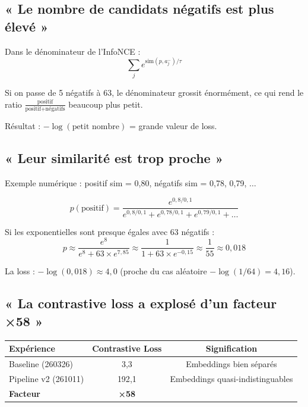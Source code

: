 \documentclass[11pt,a4paper]{article}
\begin{document}
\subsection{« Le nombre de candidats négatifs est plus élevé »}

Dans le dénominateur de l'InfoNCE :
\begin{equation}
\sum_j e^{\text{sim}(p, a^-_j)/\tau}
\end{equation}

Si on passe de 5 négatifs à 63, le dénominateur grossit énormément, ce qui rend le ratio $\frac{\text{positif}}{\text{positif} + \text{négatifs}}$ beaucoup plus petit.

Résultat : $-\log(\text{petit nombre})$ = grande valeur de loss.

\subsection{« Leur similarité est trop proche »}

Exemple numérique : positif sim = 0{,}80, négatifs sim = 0{,}78, 0{,}79, $\ldots$

\begin{equation}
p(\text{positif}) = \frac{e^{0{,}8/0{,}1}}{e^{0{,}8/0{,}1} + e^{0{,}78/0{,}1} + e^{0{,}79/0{,}1} + \ldots}
\end{equation}

Si les exponentielles sont presque égales avec 63 négatifs :
\begin{equation}
p \approx \frac{e^8}{e^8 + 63 \times e^{7{,}85}} \approx \frac{1}{1 + 63 \times e^{-0{,}15}} \approx \frac{1}{55} \approx 0{,}018
\end{equation}

La loss : $-\log(0{,}018) \approx 4{,}0$ (proche du cas aléatoire $-\log(1/64) = 4{,}16$).

\subsection{« La contrastive loss a explosé d'un facteur ×58 »}

\begin{table}[h]
\centering
\begin{tabular}{lcc}
\toprule
\textbf{Expérience} & \textbf{Contrastive Loss} & \textbf{Signification} \\
\midrule
Baseline (260326) & 3{,}3 & Embeddings bien séparés \\
Pipeline v2 (261011) & 192{,}1 & Embeddings quasi-indistinguables \\
\textbf{Facteur} & \textbf{×58} & \\
\bottomrule
\end{tabular}
\end{table}
\end{document}
